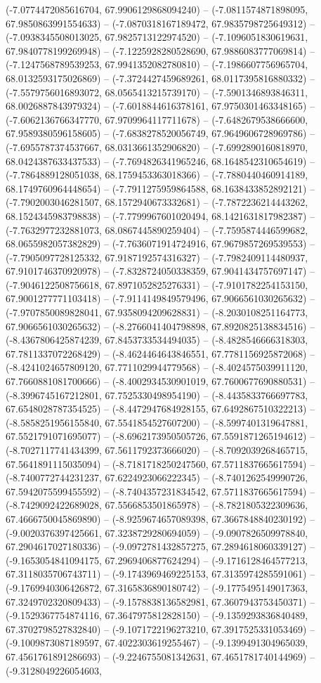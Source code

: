 (-7.0774472085616704, 67.9906129868094240) -- (-7.0811574871898095, 67.9850863991554633) -- (-7.0870318167189472, 67.9835798725649312) -- (-7.0938345508013025, 67.9825713122974520) -- (-7.1096051830619631, 67.9840778199269948) -- (-7.1225928280528690, 67.9886083777069814) -- (-7.1247568789539253, 67.9941352082780810) -- (-7.1986607756965704, 68.0132593175026869) -- (-7.3724427459689261, 68.0117395816880332) -- (-7.5579756016893072, 68.0565413215739170) -- (-7.5901346893846311, 68.0026887843979324) -- (-7.6018844616378161, 67.9750301463348165) -- (-7.6062136766347770, 67.9709964117711678) -- (-7.6482679538666600, 67.9589380596158605) -- (-7.6838278520056749, 67.9649606728969786) -- (-7.6955787374537667, 68.0313661352906820) -- (-7.6992890160818970, 68.0424387633437533) -- (-7.7694826341965246, 68.1648542310654619) -- (-7.7864889128051038, 68.1759453363018366) -- (-7.7880440460914189, 68.1749760964448654) -- (-7.7911275959864588, 68.1638433852892121) -- (-7.7902003046281507, 68.1572940673332681) -- (-7.7872236214443262, 68.1524345983798838) -- (-7.7799967601020494, 68.1421631817982387) -- (-7.7632977232881073, 68.0867445890259404) -- (-7.7595874446599682, 68.0655982057382829) -- (-7.7636071914724916, 67.9679857269539553) -- (-7.7905097728125332, 67.9187192574316327) -- (-7.7982409114480937, 67.9101746370920978) -- (-7.8328724050338359, 67.9041434757697147) -- (-7.9046122508756618, 67.8971052825276331) -- (-7.9101782254153150, 67.9001277771103418) -- (-7.9114149849579496, 67.9066561030265632) -- (-7.9707850089828041, 67.9358094209628831) -- (-8.2030108251164773, 67.9066561030265632) -- (-8.2766041404798898, 67.8920825138834516) -- (-8.4367806425874239, 67.8453733534494035) -- (-8.4828546666318303, 67.7811337072268429) -- (-8.4624464643846551, 67.7781156925872068) -- (-8.4241024657809120, 67.7711029944779568) -- (-8.4024575039911120, 67.7660881081700666) -- (-8.4002934530901019, 67.7600677690880531) -- (-8.3996745167212801, 67.7525330498954190) -- (-8.4435833766697783, 67.6548028787354525) -- (-8.4472947684928155, 67.6492867510322213) -- (-8.5858251956155840, 67.5541854527607200) -- (-8.5997401319647881, 67.5521791071695077) -- (-8.6962173950505726, 67.5591871265194612) -- (-8.7027117741434399, 67.5611792373666020) -- (-8.7092039268465715, 67.5641891115035094) -- (-8.7181718250247560, 67.5711837665617594) -- (-8.7400772744231237, 67.6224923066222345) -- (-8.7401262549990726, 67.5942075599455592) -- (-8.7404357231834542, 67.5711837665617594) -- (-8.7429092422689028, 67.5566853501865978) -- (-8.7821805322309636, 67.4666750045869890) -- (-8.9259674657089398, 67.3667848840230192) -- (-9.0020376397425661, 67.3238729280694059) -- (-9.0907826509978840, 67.2904617027180336) -- (-9.0972781432857275, 67.2894618060339127) -- (-9.1653054841094175, 67.2969406877624294) -- (-9.1716128464577213, 67.3118035706743711) -- (-9.1743969469225153, 67.3135974285591061) -- (-9.1769940306426872, 67.3165836890180742) -- (-9.1775495149017363, 67.3249702320809433) -- (-9.1578838136582981, 67.3607943753450371) -- (-9.1529367754874116, 67.3647975812828150) -- (-9.1359293836840489, 67.3702798527832840) -- (-9.1071722196273210, 67.3917525331053469) -- (-9.1009873087189597, 67.4022303619255467) -- (-9.1399491304965039, 67.4561761891286693) -- (-9.2246755081342631, 67.4651781740144969) -- (-9.3128049226054603, 